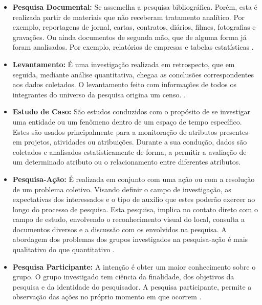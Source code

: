 \begin{itemize}
\begin{itemize}
			\item \textbf{Pesquisa Documental:} Se assemelha a pesquisa bibliográfica. Porém, esta é realizada partir de materiais que não receberam tratamento analítico. Por exemplo, reportagens de jornal, cartas, contratos, diários, filmes, fotografias e gravações. Ou ainda documentos de segunda mão, que de alguma forma já foram analisados. Por exemplo, relatórios de empresas e tabelas estatísticas \cite{Gil:2010}.

			\item \textbf{Levantamento:} É uma investigação realizada em retrospecto, que em seguida, mediante análise quantitativa, chegaa as conclusões correspondentes aos dados coletados. O levantamento feito com informações de todos os integrantes do universo da pesquisa origina um censo. \cite{Mafra:Travassos:2006}.
			
			\item \textbf{Estudo de Caso:} São estudos conduzidos com o propósito de se investigar uma entidade ou um fenômeno dentro de um espaço de tempo específico. Estes são usados principalmente para a monitoração de atributos presentes em projetos, atividades ou atribuições. Durante a sua condução, dados são coletados e analisados estatisticamente de forma, a permitir a avaliação de um determinado atributo ou o relacionamento entre diferentes atributos. \cite{Mafra:Travassos:2006}
			
			\item \textbf{Pesquisa-Ação:} É realizada em conjunto com uma ação ou com a resolução de um problema coletivo. Visando definir o campo de investigação, as expectativas dos interessados e o tipo de auxílio que estes poderão exercer ao longo do processo de pesquisa. Esta pesquisa, implica no contato direto com o campo de estudo, envolvendo o reconhecimento visual do local, consulta a documentos diversos e a discussão com os envolvidos na pesquisa. A abordagem dos problemas dos grupos investigados na pesquisa-ação é mais qualitativo do que quantitativo \cite{Silva:Tafner:2007}.
			
			\item \textbf{Pesquisa Participante:} A intenção é obter um maior conhecimento sobre o grupo. O grupo investigado tem ciência da finalidade, dos objetivos da pesquisa e da identidade do pesquisador. A pesquisa participante, permite a observação das ações no próprio momento em que ocorrem \cite{Silva:Tafner:2007}.
			

\end{itemize}
\end{itemize}
